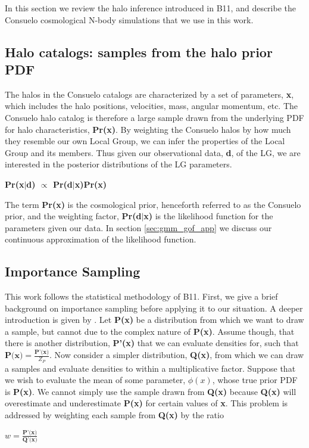 \documentclass[iop,apj,twocolappendix,numberedappendix]{emulateapj}
\newcommand{\consuelo}{{\sc Consuelo }}
\begin{document}
In this section we review the halo inference introduced in B11, and describe
the \consuelo cosmological N-body simulations that we use in this work.


\subsection{Halo catalogs: samples from the halo prior PDF}
\label{sec:sampling}


The halos in the \consuelo catalogs are characterized by a set of parameters, \textbf{x}, which includes the halo positions, velocities, mass, angular momentum, etc.  The \consuelo halo catalog is therefore a large sample drawn from the underlying PDF for halo characteristics, \textbf{Pr(x)}.  By weighting the \consuelo halos by how much they resemble our own Local Group, we can infer the properties of the Local Group and its members.  Thus given our observational data, \textbf{d}, of the LG, we are interested in the posterior distributions of the LG parameters.
\begin{center}

\textbf{Pr(x$\vert$d) $\propto$ Pr(d$\vert$x)Pr(x)}

\end{center}
The term \textbf{Pr(x)} is the cosmological prior, henceforth referred to as the \consuelo prior, and the weighting factor, \textbf{Pr(d$\vert$x)} is the likelihood function for the parameters given our data. In section
\ref{sec:gmm_gof_app}
we discuss our continuous approximation of the likelihood function.

\subsection{Importance Sampling}
\label{sec:importance}
This work follows the statistical methodology of B11. First, we give a brief background on importance sampling before applying it to our situation. A deeper introduction is given by \cite{imp_book}. Let \textbf{P(x)} be a distribution from which we want to draw a sample, but cannot due to the complex nature of \textbf{P(x)}. Assume though, that there is another distribution, \textbf{P'(x)} that we can evaluate densities for, such that $\textbf{P(x)}=\frac{\textbf{P'(x)}}{Z_{P}}$. Now consider a simpler distribution, \textbf{Q(x)}, from which we can draw a samples and evaluate densities to within a multiplicative factor. Suppose that we wish to evaluate the mean of some parameter, $\phi(x)$, whose true prior PDF is \textbf{P(x)}. We cannot simply use the sample drawn from \textbf{Q(x)} because \textbf{Q(x)} will overestimate and underestimate \textbf{P(x)} for certain values of \textbf{x}. This problem is addressed by weighting each sample from \textbf{Q(x)} by the ratio 
\begin{center}
$w = \frac{\textbf{P'(x)}}{\textbf{Q'(x)}}$
\end{center}
\end{document}

